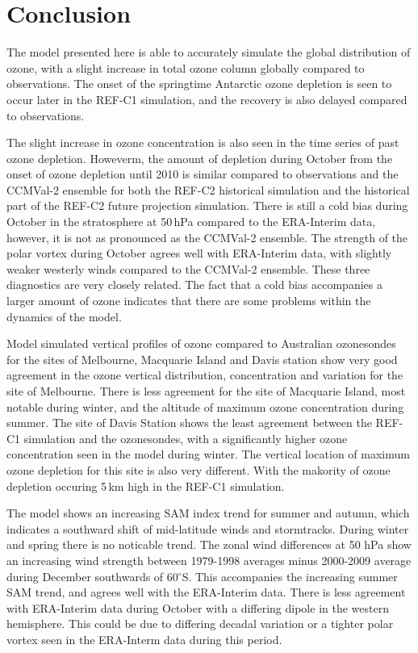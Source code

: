 \section{Conclusion}

The model presented here is able to accurately simulate the global distribution of ozone, with a slight increase in total ozone column globally compared to observations. The onset of the springtime Antarctic ozone depletion is seen to occur later in the REF-C1 simulation, and the recovery is also delayed compared to observations. 

The slight increase in ozone concentration is also seen in the time series of past ozone depletion. Howeverm, the amount of depletion during October from the onset of ozone depletion until 2010 is similar compared to observations and the CCMVal-2 ensemble for both the REF-C2 historical simulation and the historical part of the REF-C2 future projection simulation. There is still a cold bias during October in the stratosphere at 50\,hPa compared to the ERA-Interim data, however, it is not as pronounced as the CCMVal-2 ensemble. The strength of the polar vortex during October agrees well with ERA-Interim data, with slightly weaker westerly winds compared to the CCMVal-2 ensemble. These three diagnostics are very closely related. The fact that a cold bias accompanies a larger amount of ozone indicates that there are some problems within the dynamics of the model. 

Model simulated vertical profiles of ozone compared to Australian ozonesondes for the sites of Melbourne, Macquarie Island and Davis station show very good agreement in the ozone vertical distribution, concentration and variation for the site of Melbourne. There is less agreement for the site of Macquarie Island, most notable during winter, and the altitude of maximum ozone concentration during summer. The site of Davis Station shows the least agreement between the REF-C1 simulation and the ozonesondes, with a significantly higher ozone concentration seen in the model during winter. The vertical location of maximum ozone depletion for this site is also very different. With the makority of ozone depletion occuring 5\,km high in the REF-C1 simulation.

The model shows an increasing SAM index trend for summer and autumn, which indicates a southward shift of mid-latitude winds and stormtracks. During winter and spring there is no noticable trend. The zonal wind differences at 50 hPa show an increasing wind strength between 1979-1998 averages minus 2000-2009 average during December southwards of 60$^\circ$S. This accompanies the increasing summer SAM trend, and agrees well with the ERA-Interim data. There is less agreement with ERA-Interim data during October with a differing dipole in the western hemisphere. This could be due to differing decadal variation or a tighter polar vortex seen in the ERA-Interm data during this period.

